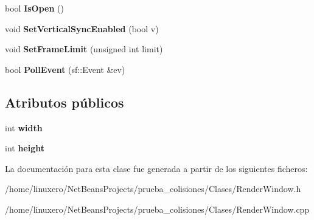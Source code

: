 \begin{DoxyCompactItemize}
\item 
\hypertarget{classRenderWindow_a52e145a0533dac734b060a4b88d1d880}{bool {\bfseries Is\-Open} ()}\label{classRenderWindow_a52e145a0533dac734b060a4b88d1d880}

\item 
\hypertarget{classRenderWindow_abff1ddc8df26b594595e93bba6ecf742}{void {\bfseries Set\-Vertical\-Sync\-Enabled} (bool v)}\label{classRenderWindow_abff1ddc8df26b594595e93bba6ecf742}

\item 
\hypertarget{classRenderWindow_a97103ac486ade364b0f43f8004e984da}{void {\bfseries Set\-Frame\-Limit} (unsigned int limit)}\label{classRenderWindow_a97103ac486ade364b0f43f8004e984da}

\item 
\hypertarget{classRenderWindow_a83ac01b4e4f8266272fc44f93f2b795e}{bool {\bfseries Poll\-Event} (sf\-::\-Event \&ev)}\label{classRenderWindow_a83ac01b4e4f8266272fc44f93f2b795e}

\end{DoxyCompactItemize}
\subsection*{Atributos públicos}
\begin{DoxyCompactItemize}
\item 
\hypertarget{classRenderWindow_ab908f6f819a6ce504b65de39865b12ff}{int {\bfseries width}}\label{classRenderWindow_ab908f6f819a6ce504b65de39865b12ff}

\item 
\hypertarget{classRenderWindow_a4e309bfa4dc9904ba186c5de405745d2}{int {\bfseries height}}\label{classRenderWindow_a4e309bfa4dc9904ba186c5de405745d2}

\end{DoxyCompactItemize}


La documentación para esta clase fue generada a partir de los siguientes ficheros\-:\begin{DoxyCompactItemize}
\item 
/home/linuxero/\-Net\-Beans\-Projects/prueba\-\_\-colisiones/\-Clases/Render\-Window.\-h\item 
/home/linuxero/\-Net\-Beans\-Projects/prueba\-\_\-colisiones/\-Clases/Render\-Window.\-cpp\end{DoxyCompactItemize}
